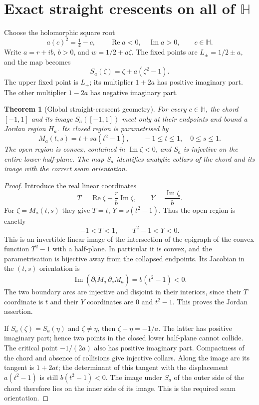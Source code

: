\documentclass[11pt]{article}
\newtheorem{theorem}{Theorem}
\newcommand{\HH}{\mathbb H}
\newcommand{\re}{\operatorname{Re}}
\newcommand{\im}{\operatorname{Im}}
\begin{document}
\section{Exact straight crescents on all of $\HH$}
Choose the holomorphic square root
\[
 a(c)^2=\tfrac14-c,\qquad \re a<0,\quad \im a>0,\qquad c\in\HH.
\]
Write $a=r+ib$, $b>0$, and $w=1/2+a\zeta$. The fixed points are
$L_\pm=1/2\pm a$, and the map becomes
\[
 S_a(\zeta)=\zeta+a(\zeta^2-1).
\]
The upper fixed point is $L_+$; its multiplier $1+2a$ has positive imaginary
part. The other multiplier $1-2a$ has negative imaginary part.

\begin{theorem}[Global straight-crescent geometry]\label{thm:straight}
For every $c\in\HH$, the chord $[-1,1]$ and its image $S_a([-1,1])$ meet only
at their endpoints and bound a Jordan region $H_a$. Its closed region is
parametrised by
\[
 M_a(t,s)=t+s a(t^2-1),\qquad -1\le t\le1,\quad 0\le s\le1.
\]
The open region is convex, contained in $\im\zeta<0$, and $S_a$ is injective
on the entire lower half-plane. The map $S_a$ identifies analytic collars
of the chord and its image with the correct seam orientation.
\end{theorem}
\begin{proof}
Introduce the real linear coordinates
\[
 T=\re\zeta-\frac rb\im\zeta,\qquad Y=\frac{\im\zeta}{b}.
\]
For $\zeta=M_a(t,s)$ they give $T=t$, $Y=s(t^2-1)$. Thus the open region is
exactly
\[
 -1<T<1,\qquad T^2-1<Y<0.
\]
This is an invertible linear image of the intersection of the epigraph of
the convex function $T^2-1$ with a half-plane. In particular it is convex,
and the parametrisation is bijective away from the collapsed endpoints.
Its Jacobian in the $(t,s)$ orientation is
\[
 \im(\overline{\partial_tM_a}\,\partial_sM_a)=b(t^2-1)<0.
\]
The two boundary arcs are injective and disjoint in their interiors, since
their $T$ coordinate is $t$ and their $Y$ coordinates are $0$ and $t^2-1$.
This proves the Jordan assertion.

If $S_a(\zeta)=S_a(\eta)$ and $\zeta\ne\eta$, then $\zeta+\eta=-1/a$.
The latter has positive imaginary part; hence two points in the closed
lower half-plane cannot collide. The critical point $-1/(2a)$ also has
positive imaginary part. Compactness of the chord and absence of collisions
give injective collars. Along the image arc its tangent is $1+2at$;
the determinant of this tangent with the displacement $a(t^2-1)$ is still
$b(t^2-1)<0$. The image under $S_a$ of the outer side of the chord therefore
lies on the inner side of its image. This is the required seam orientation.
\end{proof}
\end{document}
